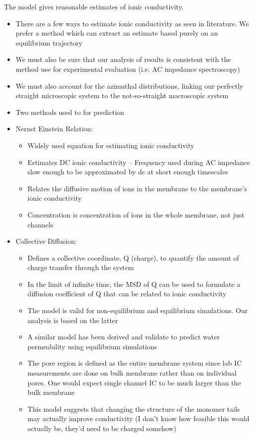 \documentclass{article}
\begin{document}
\begin{itemize}
\begin{itemize}
	The model gives reasonable estimates of ionic conductivity.
	\begin{itemize}
		\item There are a few ways to estimate ionic conductivity as seen in literature. We prefer a method which can extract an estimate based purely on an equilibrium trajectory
		\item We must also be sure that our analysis of results is consistent with the method use for experimental evaluation (i.e. AC impedance spectroscopy)
		\item We must also account for the azimuthal distributions, linking our perfectly straight microscopic system to the not-so-straight macroscopic system
		\item Two methods used to for prediction
		\item Nernst Einstein Relation:
		\begin{itemize}
			\item Widely used equation for estimating ionic conductivity
			\item Estimates DC ionic conductivity -- Frequency used during AC impedance slow enough to be approximated by dc at short enough timescales
			\item Relates the diffusive motion of ions in the membrane to the membrane's ionic conductivity
			\item Concentration is concentration of ions in the whole membrane, not just channels
		\end{itemize}
		\item Collective Diffusion:
		\begin{itemize}
			\item Defines a collective coordinate, Q (charge), to quantify the amount of charge transfer through the system
			\item In the limit of infinite time, the MSD of Q can be used to formulate a diffusion coefficient of Q that can be related to ionic conductivity
			\item The model is valid for non-equilibrium and equilibrium simulations. Our analysis is based on the latter
			\item A similar model has been derived and validate to predict water permeability using equilibrium simulations
			\item The pore region is defined as the entire membrane system since lab IC measurements are done on bulk membrane rather than on individual pores. One would expect single channel IC to be much larger than the bulk membrane
			\item This model suggests that changing the structure of the monomer tails may actually improve conductivity (I don't know how feasible this would actually be, they'd need to be charged somehow) 

\end{itemize}
\end{itemize}
\end{itemize}
\end{itemize}
\end{document}
